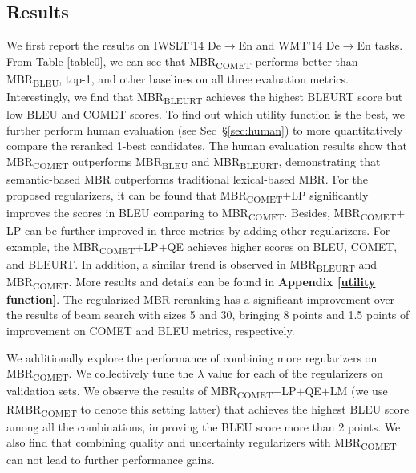 \documentclass{article}
\begin{document}
\subsection{Results}
We first report the results on IWSLT’14 De$\to$En and WMT’14 De$\to$En tasks. From Table \ref{table0}, we can see that MBR\textsubscript{COMET} performs better than MBR\textsubscript{BLEU}, top-1, and other baselines on all three evaluation metrics. Interestingly, we find that MBR\textsubscript{BLEURT} achieves the highest BLEURT score but low BLEU and COMET scores. To find out which utility function is the best, we further perform human evaluation (see Sec~\S\ref{sec:human}) to more quantitatively compare the reranked 1-best candidates. The human evaluation results show that MBR\textsubscript{COMET} outperforms MBR\textsubscript{BLEU} and MBR\textsubscript{BLEURT}, demonstrating that semantic-based MBR outperforms traditional lexical-based MBR. 
For the proposed regularizers, it can be found that MBR\textsubscript{COMET}$+$LP significantly improves the scores in BLEU comparing to MBR\textsubscript{COMET}. %
Besides, MBR\textsubscript{COMET}$+$LP can be further improved in three metrics by adding other regularizers. For example, the MBR\textsubscript{COMET}$+$LP$+$QE achieves higher scores on BLEU, COMET, and BLEURT. In addition, a similar trend is observed in MBR\textsubscript{BLEURT} and MBR\textsubscript{COMET}. More results and details can be found in \textbf{Appendix \ref{utility function}}. The regularized MBR reranking has a significant improvement over the results of beam search with sizes 5 and 30, bringing 8 points and 1.5 points of improvement on COMET and BLEU metrics, respectively.

We additionally explore the performance of combining more regularizers on MBR\textsubscript{COMET}. We collectively tune the $\lambda$ value for each of the regularizers on validation sets. We observe the results of MBR\textsubscript{COMET}$ + $LP$ + $QE$ + $LM (we use RMBR\textsubscript{COMET} to denote this setting latter) that achieves the highest BLEU score among all the combinations, improving the BLEU score more than 2 points. We also find that combining quality and uncertainty regularizers with MBR\textsubscript{COMET} can not lead to further performance gains.
\end{document}
